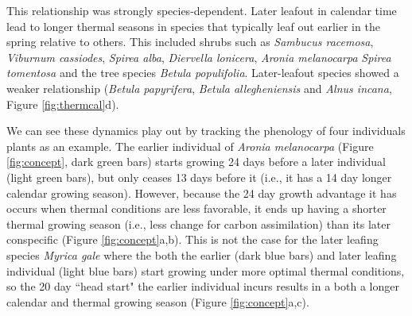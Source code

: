 \documentclass{article}[12pt]
\begin{document}
This relationship was strongly species-dependent. Later leafout in calendar time lead to longer thermal seasons in species that typically leaf out earlier in the spring relative to others. This included shrubs such as \emph{Sambucus racemosa}, \emph{Viburnum cassiodes}, \emph{Spirea alba}, \emph{Diervella lonicera}, \emph{Aronia melanocarpa} \emph{Spirea tomentosa} and the tree species \emph{Betula populifolia}. Later-leafout species showed a weaker relationship (\emph{Betula papyrifera}, \emph{Betula allegheniensis} and \emph{Alnus incana}, Figure \ref{fig:thermcal}d). 

We can see these dynamics play out by tracking the phenology of four individuals plants as an example. The earlier individual of \emph{Aronia melanocarpa} (Figure \ref{fig:concept}, dark green bars) starts growing 24 days before a later individual (light green bars), but only ceases 13 days before it (i.e., it has a 14 day longer calendar growing season). However, because the 24 day growth advantage it has occurs when thermal conditions are less favorable, it ends up having a shorter thermal growing season (i.e., less change for carbon assimilation) than its later conspecific (Figure \ref{fig:concept}a,b). This is not the case for the later leafing species \emph{Myrica gale} where the both the earlier (dark blue bars) and later leafing individual (light blue bars) start growing under more optimal thermal conditions, so the 20 day ``head start" the earlier individual incurs results in a both a longer calendar and thermal growing season (Figure \ref{fig:concept}a,c). 
\end{document}
